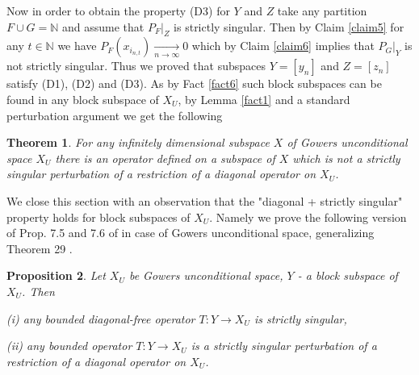 \documentclass{amsart}
\newtheorem{theorem}{Theorem}[section]
\newtheorem{proposition}[theorem]{Proposition}
\numberwithin{subsection}{section}
\numberwithin{equation}{section}
\begin{document}
Now in order to obtain the property (D3) for $Y$ and $Z$ take any partition $F\cup G={{\mathbb{N}}}$ and assume that $P_F|_Z$ is strictly singular. Then by Claim \ref{claim5} for any $t\in{{\mathbb{N}}}$ we have $P_F(x_{i_{n,t}})\xrightarrow[n\to\infty]{}0$ which by Claim \ref{claim6} implies that $P_G|_Y$ is not strictly singular. Thus we proved that subspaces $Y=[y_n]$ and $Z=[z_n]$ satisfy (D1), (D2) and (D3). As by Fact \ref{fact6} such block subspaces can be found in any block subspace of $X_U$, by Lemma \ref{fact1} and a standard perturbation argument we get the following
\begin{theorem}\label{gow3}
For any infinitely dimensional subspace $X$ of Gowers unconditional space $X_U$ there is an operator defined on a subspace of $X$ which is not a strictly singular perturbation of a restriction of a diagonal operator on $X_U$. 
\end{theorem}
We close this section with an observation that the "diagonal + strictly singular" property holds for block subspaces of $X_U$. Namely we prove the following version of Prop. 7.5 and 7.6 of \cite{ABR} in case of Gowers unconditional space, generalizing Theorem 29 \cite{GM}. 
\begin{proposition}\label{gow1} Let $X_U$ be Gowers unconditional space, $Y$ - a block subspace of $X_U$. Then 

(i) any bounded diagonal-free operator $T: Y\to X_U$ is strictly singular,

(ii) any bounded operator $T: Y\to X_U$ is a strictly singular perturbation of a restriction of a diagonal operator on $X_U$. 
\end{proposition}
\end{document}
